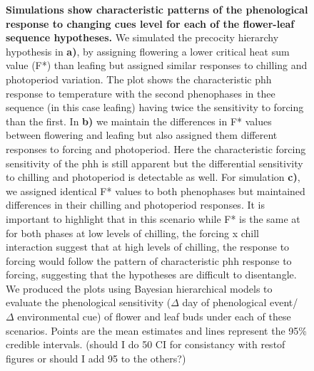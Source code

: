 \documentclass[11pt]{article}
\begin{document}
\begin{figure}[h!]
    \caption{\textbf{Simulations show characteristic patterns of the phenological response to changing cues level for each of the flower-leaf sequence hypotheses.} We simulated the precocity hierarchy hypothesis in \textbf{a)}, by assigning flowering a lower critical heat sum value (F*) than leafing but assigned similar responses to chilling and photoperiod variation. The plot shows the characteristic phh response to temperature with the second phenophases in thee sequence (in this case leafing) having twice the sensitivity to forcing than the first. In \textbf{b)} we maintain the differences in F* values between flowering and leafing but also assigned them different responses to forcing and photoperiod. Here the characteristic forcing sensitivity of the phh is still apparent but the differential sensitivity to chilling and photoperiod is detectable as well. For simulation \textbf{c)}, we assigned identical F* values to both phenophases but maintained differences in their chilling and photoperiod responses. It is important to highlight that in this scenario while F* is the same at for both phases at low levels of chilling, the forcing x chill interaction suggest that at high levels of chilling, the response to forcing would follow the pattern of characteristic phh response to forcing, suggesting that the hypotheses are difficult to disentangle. We produced the plots using Bayesian hierarchical models to evaluate the phenological sensitivity ($\Delta$ day of phenological event/ $\Delta$ environmental cue) of flower and leaf buds under each of these scenarios. Points are the mean estimates and lines represent the 95\% credible intervals. (should I do 50 CI for consistancy with restof figures or should I add 95 to the others?) } 
    \label{fig:simulations}
\end{figure}
\end{document}
